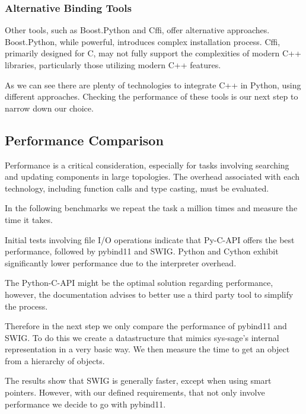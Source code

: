 \subsubsection{Alternative Binding Tools}

Other tools, such as Boost.Python and Cffi, offer alternative approaches. Boost.Python, while powerful, introduces complex installation process. Cffi, primarily designed for C, may not fully support the complexities of modern C++ libraries, particularly those utilizing modern C++ features. \cite{boost-docu} \cite{cffi-docu}

\smallskip
As we can see there are plenty of technologies to integrate C++ in Python, using different approaches. Checking the performance of these tools is our next step to narrow down our choice.

\subsection{Performance Comparison}

Performance is a critical consideration, especially for tasks involving searching and updating components in large topologies. The overhead associated with each technology, including function calls and type casting, must be evaluated. 

In the following benchmarks we repeat the task a million times and measure the time it takes.

Initial tests involving file I/O operations indicate that Py-C-API offers the best performance, followed by pybind11 and SWIG. Python and Cython exhibit significantly lower performance due to the interpreter overhead.



The Python-C-API might be the optimal solution regarding performance, however, the documentation advises to better use a third party tool to simplify the process. \cite{py-c-api}

Therefore in the next step we only compare the performance of pybind11 and SWIG. To do this we create a datastructure that mimics sys-sage's internal representation in a very basic way. We then measure the time to get an object from a hierarchy of objects. 






\newpage
The results show that SWIG is generally faster, except when using smart pointers. However, with our defined requirements, that not only involve performance we decide to go with pybind11.


